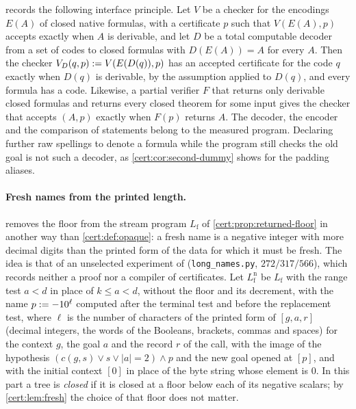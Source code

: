\begin{remark}\label{cert:rem:decoded}
 records the following interface principle. Let $V$ be a checker for the
encodings $E(A)$ of closed native formulas, with a certificate $p$ such that $V(E(A),p)$ accepts
exactly when $A$ is derivable, and let $D$ be a total computable decoder from a set of codes to
closed formulas with $D(E(A))=A$ for every $A$. Then the checker $V_D(q,p)\mathrel{:=} V(E(D(q)),p)$ has
an accepted certificate for the code $q$ exactly when $D(q)$ is derivable, by the assumption applied
to $D(q)$, and every formula has a code. Likewise, a partial verifier $F$ that returns only derivable
closed formulas and returns every closed theorem for some input gives the checker that accepts
$(A,p)$ exactly when $F(p)$ returns $A$. The decoder, the encoder and the comparison of statements
belong to the measured program. Declaring further raw spellings to denote a formula while the program
still checks the old goal is not such a decoder, as \cref{cert:cor:second-dummy} shows for the
padding aliases.
\end{remark}

\paragraph{Fresh names from the printed length.}  removes the floor from the
stream program $L_{\mathrm f}$ of \cref{cert:prop:returned-floor} in another way than
\cref{cert:def:opaque}: a fresh name is a negative integer with more decimal digits than the printed
form of the data for which it must be fresh. The idea is that of an unselected experiment of
 (\texttt{long\_names.py}, $272/317/566$), which records neither a proof nor a
compiler of certificates. Let $L^{\mathrm n}_{\mathrm f}$ be $L_{\mathrm f}$ with the range test
$a<d$ in place of $k\le a<d$, without the floor and its decrement, with the name
$p\mathrel{:=}-10^{\ell}$ computed after the terminal test and before the replacement test, where $\ell$
is the number of characters of the printed form of $[g,a,r]$ (decimal integers, the words of the
Booleans, brackets, commas and spaces) for the context $g$, the goal $a$ and the record $r$ of the
call, with the image of the hypothesis $(c(g,s)\lor s\lor\lvert a\rvert=2)\land p$ and the new goal
opened at $[p]$, and with the initial context $[0]$ in place of the byte string whose element is $0$.
In this part a tree is \emph{closed} if it is closed at a floor below each of its negative scalars;
by \cref{cert:lem:fresh} the choice of that floor does not matter.

